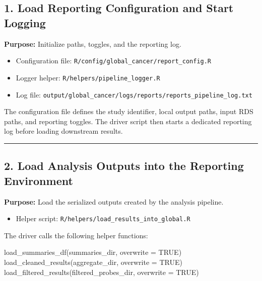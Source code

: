 \documentclass[
  letterpaper,
  DIV=11,
  numbers=noendperiod,
  openany,
  oneside]{scrreprt}
\newenvironment{Shaded}{\begin{snugshade}}{\end{snugshade}}
\newcommand{\AttributeTok}[1]{\textcolor[rgb]{0.40,0.45,0.13}{#1}}
\newcommand{\ConstantTok}[1]{\textcolor[rgb]{0.56,0.35,0.01}{#1}}
\newcommand{\FunctionTok}[1]{\textcolor[rgb]{0.28,0.35,0.67}{#1}}
\newcommand{\NormalTok}[1]{\textcolor[rgb]{0.00,0.23,0.31}{#1}}
\providecommand{\tightlist}{%
  \setlength{\itemsep}{0pt}\setlength{\parskip}{0pt}}
\begin{document}
\subsection*{1. Load Reporting Configuration and Start
Logging}\label{load-reporting-configuration-and-start-logging}

\textbf{Purpose:} Initialize paths, toggles, and the reporting log.

\begin{itemize}
\tightlist
\item
  Configuration file: \texttt{R/config/global\_cancer/report\_config.R}
\item
  Logger helper: \texttt{R/helpers/pipeline\_logger.R}
\item
  Log file:
  \texttt{output/global\_cancer/logs/reports/reports\_pipeline\_log.txt}
\end{itemize}

The configuration file defines the study identifier, local output paths,
input RDS paths, and reporting toggles. The driver script then starts a
dedicated reporting log before loading downstream results.

\begin{center}\rule{0.5\linewidth}{0.5pt}\end{center}

\subsection*{2. Load Analysis Outputs into the Reporting
Environment}\label{load-analysis-outputs-into-the-reporting-environment}

\textbf{Purpose:} Load the serialized outputs created by the analysis
pipeline.

\begin{itemize}
\tightlist
\item
  Helper script: \texttt{R/helpers/load\_results\_into\_global.R}
\end{itemize}

The driver calls the following helper functions:

\begin{Shaded}
\begin{Highlighting}[]
\FunctionTok{load\_summaries\_df}\NormalTok{(summaries\_dir, }\AttributeTok{overwrite =} \ConstantTok{TRUE}\NormalTok{)}
\FunctionTok{load\_cleaned\_results}\NormalTok{(aggregate\_dir, }\AttributeTok{overwrite =} \ConstantTok{TRUE}\NormalTok{)}
\FunctionTok{load\_filtered\_results}\NormalTok{(filtered\_probes\_dir, }\AttributeTok{overwrite =} \ConstantTok{TRUE}\NormalTok{)}
\end{Highlighting}
\end{Shaded}
\end{document}
